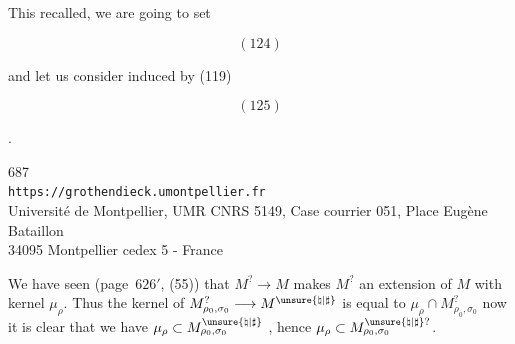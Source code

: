 This recalled, we are going to set
\begin{samepage}
\[
(124)
\]
\end{samepage}
and let us consider  induced by (119)
\begin{samepage}
\[
(125)
\]
\end{samepage}
.


\begin{center}
687\\
\texttt{https://grothendieck.umontpellier.fr}\\
Université de Montpellier, UMR CNRS 5149, Case courrier 051, Place Eugène Bataillon\\
34095 Montpellier cedex 5 - France
\end{center}



We have seen (page\ $626'$, (55)) that $M^?\longrightarrow M$ makes $M^?$
an extension of $M$ with kernel $\mu_\rho$.
Thus the kernel of $M_{\rho_0,\sigma_0}^?\longrightarrow
M^{\unsure{\natural|\sharp}}$ is equal to
$\mu_\rho\cap M_{\rho_0,\sigma_0}^?$
now it is clear that we have
$\mu_\rho\subset M_{\rho_0,\sigma_0}^{\unsure{\natural|\sharp}}$
,
hence $\mu_\rho\subset
M_{\rho_0,\sigma_0}^{\unsure{\natural|\sharp}?}$.


